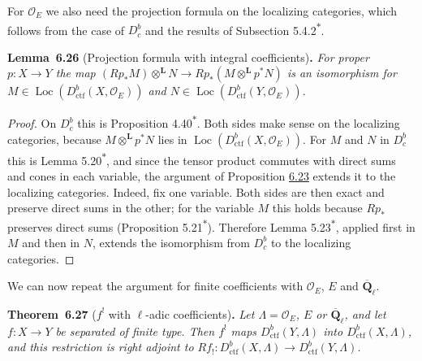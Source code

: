 \documentclass[11pt]{article}
\newenvironment{bpstatement}[2]{\par\addvspace{0.6\baselineskip}\noindent\textbf{#1}#2\textbf{.}\enspace\ignorespaces}
  {\par\addvspace{0.4\baselineskip}}
\newenvironment{bpstatementit}[2]{\begin{bpstatement}{#1}{#2}\itshape\ignorespaces}{\end{bpstatement}}
\newcommand{\bpout}[1]{#1\textsuperscript{\hyperlink{bp-outside}{\ensuremath{\ast}}}}
\providecommand{\Dbc}{}\renewcommand{\Dbc}{D^b_c}
\providecommand{\Loc}{}\renewcommand{\Loc}{\operatorname{Loc}}
\begin{document}
\label{bp80}%
For \(\mathcal O_E\) we also need the projection formula on the localizing categories, which follows from the case of \(\Dbc\) and the results of Subsection \bpout{5.4.2}.

\label{bp81}%
\begin{bpstatementit}{Lemma~6.26}{ (Projection formula with integral coefficients)}
For proper \(p:X\to Y\) the map \((Rp_*M)\otimes^{\mathbf L}N\to Rp_*(M\otimes^{\mathbf L}p^*N)\) is an isomorphism for \(M\in\Loc(D^b_{\mathrm{ctf}}(X,\mathcal O_E))\) and \(N\in\Loc(D^b_{\mathrm{ctf}}(Y,\mathcal O_E))\).
\end{bpstatementit}

\begin{proof}[{Proof}]\label{bp82}%
On \(\Dbc\) this is Proposition \bpout{4.40}. Both sides make sense on the localizing categories, because \(M\otimes^{\mathbf L}p^*N\) lies in \(\Loc(D^b_{\mathrm{ctf}}(X,\mathcal O_E))\). For \(M\) and \(N\) in \(\Dbc\) this is Lemma \bpout{5.20}, and since the tensor product commutes with direct sums and cones in each variable, the argument of Proposition \hyperref[bp72]{6.23} extends it to the localizing categories. Indeed, fix one variable. Both sides are then exact and preserve direct sums in the other; for the variable \(M\) this holds because \(Rp_*\) preserves direct sums (Proposition \bpout{5.21}). Therefore Lemma \bpout{5.23}, applied first in \(M\) and then in \(N\), extends the isomorphism from \(\Dbc\) to the localizing categories.
\end{proof}

\label{bp83}%
We can now repeat the argument for finite coefficients with \(\mathcal O_E\), \(E\) and \(\overline{\mathbf Q}_\ell\).

\label{bp84}%
\begin{bpstatementit}{Theorem~6.27}{ ($f^!$ with $\ell$-adic coefficients)}
Let \(\Lambda=\mathcal O_E\), \(E\) or \(\overline{\mathbf Q}_\ell\), and let \(f:X\to Y\) be separated of finite type. Then \(f^!\) maps \(D^b_{\mathrm{ctf}}(Y,\Lambda)\) into \(D^b_{\mathrm{ctf}}(X,\Lambda)\), and this restriction is right adjoint to \(Rf_!:D^b_{\mathrm{ctf}}(X,\Lambda)\to D^b_{\mathrm{ctf}}(Y,\Lambda)\).
\end{bpstatementit}
\end{document}
